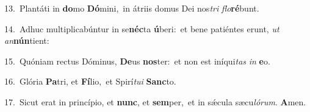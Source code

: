 {\numbfont\textcolor{\numbcolor}{13.}}~Plantáti in \textbf{do}\-mo \textbf{Dó}\-mini,~\star in átriis domus Dei nos\textit{tri} \textit{flo}\-\textbf{ré}bunt.\par
{\numbfont\textcolor{\numbcolor}{14.}}~Adhuc multiplicabúntur in se\-\textbf{néc}\-ta \textbf{ú}\-beri:~\star et bene patiéntes erunt, \textit{ut} \textit{an}\-\textbf{nún}tient:\par
{\numbfont\textcolor{\numbcolor}{15.}}~Quóniam rectus Dóminus, \textbf{De}\-us \textbf{nos}\-ter:~\star et non est iníqui\textit{tas} \textit{in} \textbf{e}\-o.\par
{\numbfont\textcolor{\numbcolor}{16.}}~Glória \textbf{Pa}\-tri, et \textbf{Fí}\-lio,~\star et Spirí\-\textit{tu}\-\textit{i} \textbf{Sanc}\-to.\par
{\numbfont\textcolor{\numbcolor}{17.}}~Sicut erat in princípio, et \textbf{nunc}\-, et \textbf{sem}\-per,~\star et in sǽcula sæcu\-\textit{ló}\-\textit{rum}. \textbf{A}\-men.\par
